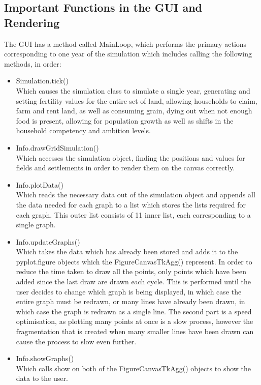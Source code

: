 \documentclass[12pt]{article}
\begin{document}
		\subsection{Important Functions in the GUI and Rendering}
			The GUI has a method called MainLoop, which performs the primary actions corresponding to one year of the simulation which includes calling the following methods, in order:
			\begin{itemize}
				\item Simulation.tick()\\
				Which causes the simulation class to simulate a single year, generating and setting fertility values for the entire set of land, allowing households to claim, farm and rent land, as well as consuming grain, dying out when not enough food is present, allowing for population growth as well as shifts in the household competency and ambition levels.
				\item Info.drawGridSimulation()\\
				Which accesses the simulation object, finding the positions and values for fields and settlements in order to render them on the canvas correctly.
				\item Info.plotData()\\
				Which reads the necessary data out of the simulation object and appends all the data needed for each graph to a list which stores the lists required for each graph. This outer list consists of 11 inner list, each corresponding to a single graph.
				\item Info.updateGraphs()\\
				Which takes the data which has already been stored and adds it to the pyplot.figure objects which the FigureCanvasTkAgg() represent. In order to reduce the time taken to draw all the points, only points which have been added since the last draw are drawn each cycle. This is performed until the user decides to change which graph is being displayed, in which case the entire graph must be redrawn, or many lines have already been drawn, in which case the graph is redrawn as a single line. The second part is a speed optimisation, as plotting many points at once is a slow process, however the fragmentation that is created when many smaller lines have been drawn can cause the process to slow even further.
				\item Info.showGraphs()\\
				Which calls show on both of the FigureCanvasTkAgg() objects to show the data to the user.
			\end{itemize}
			
\end{document}

